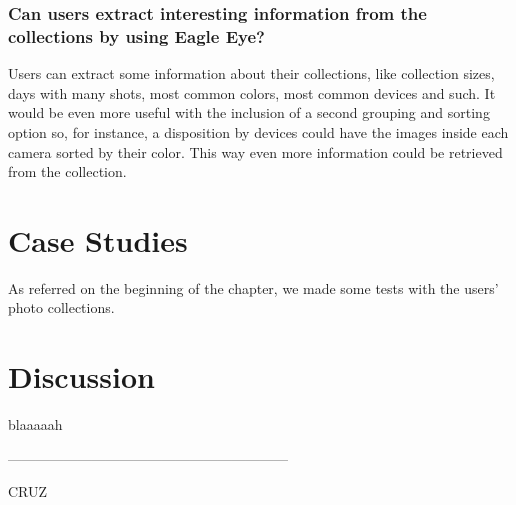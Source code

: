 \subsubsection{Can users extract interesting information from the collections by using Eagle Eye?}

Users can extract some information about their collections, like collection sizes, days with many shots, most common colors, most common devices and such. It would be even more useful with the inclusion of a second grouping and sorting option so, for instance, a disposition by devices could have the images inside each camera sorted by their color. This way even more information could be retrieved from the collection.


\section{Case Studies}

As referred on the beginning of the chapter, we made some tests with the users' photo collections. 

\section{Discussion}

blaaaaah

\newpage

————————————————————

CRUZ

